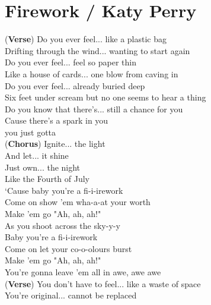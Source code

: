 \section{Firework / Katy Perry}\label{ch:firework}
\Amajor
\Bminor
\FsharpMinor
\DmajorEasy
\EmajorEasy


(\textbf{Verse})  Do you ever feel...  like a plastic bag\\
 Drifting through the wind...  wanting to start again\\
 Do you ever feel... feel so paper thin\\
 Like a house of cards...  one blow from caving in\\
 Do you ever feel...  already buried deep\\
 Six feet under scream but no one seems to hear a thing\\
 Do you know that there's... still a chance for you\\
 Cause there's a spark in you\\
 you just gotta\\
(\textbf{Chorus}) Ignite... the light\\
And let... it shine\\
Just own... the night\\
Like the Fourth of July\\
‘Cause baby you're a fi-i-irework\\
Come on show 'em wha-a-at your worth\\
Make 'em go "Ah, ah, ah!"\\
As you shoot across the sky-y-y\\
Baby you're a fi-i-irework\\
Come on let your co-o-olours burst\\
Make 'em go "Ah, ah, ah!"\\
You're gonna leave 'em all in awe, awe awe\\
(\textbf{Verse})  You don't have to feel... like a waste of space\\
 You're original...  cannot be replaced\\
